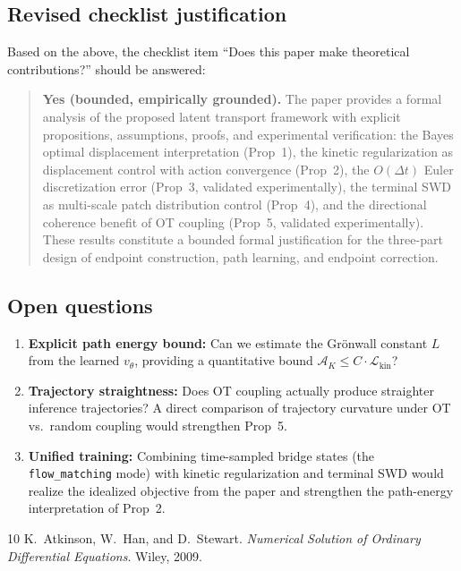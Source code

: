 \documentclass[letterpaper]{article}
\newcommand{\cA}{\mathcal{A}}
\newcommand{\cL}{\mathcal{L}}
\begin{document}
\subsection{Revised checklist justification}

Based on the above, the checklist item
``Does this paper make theoretical contributions?'' should be answered:

\begin{quote}
\textbf{Yes (bounded, empirically grounded).}
The paper provides a formal analysis of the proposed latent transport
framework with explicit propositions, assumptions, proofs, and experimental
verification: the Bayes optimal displacement interpretation (Prop~1),
the kinetic regularization as displacement control with action convergence
(Prop~2), the $O(\Delta t)$ Euler discretization error (Prop~3, validated
experimentally), the terminal SWD as multi-scale patch distribution control
(Prop~4), and the directional coherence benefit of OT coupling (Prop~5,
validated experimentally). These results constitute a bounded formal
justification for the three-part design of endpoint construction,
path learning, and endpoint correction.
\end{quote}

\subsection{Open questions}

\begin{enumerate}
    \item \textbf{Explicit path energy bound:} Can we estimate the Gr\"onwall
    constant $L$ from the learned $v_\theta$, providing a quantitative bound
    $\cA_K \leq C\cdot\cL_{\text{kin}}$?
    \item \textbf{Trajectory straightness:} Does OT coupling actually produce
    straighter inference trajectories? A direct comparison of trajectory
    curvature under OT vs.~random coupling would strengthen Prop~5.
    \item \textbf{Unified training:} Combining time-sampled bridge states
    (the \texttt{flow\_matching} mode) with kinetic regularization and
    terminal SWD would realize the idealized objective from the paper and
    strengthen the path-energy interpretation of Prop~2.
\end{enumerate}


\begin{thebibliography}{10}
K.~Atkinson, W.~Han, and D.~Stewart.
\emph{Numerical Solution of Ordinary Differential Equations}. Wiley, 2009.
\end{thebibliography}
\end{document}
